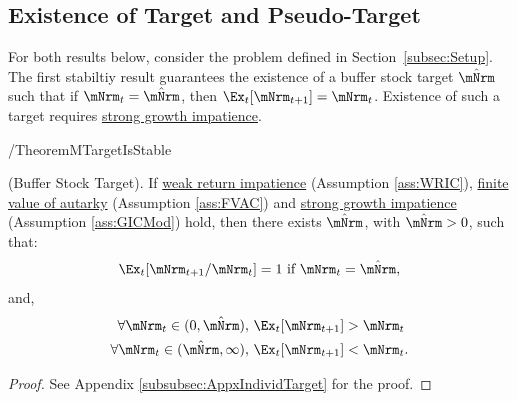 \documentclass[BufferStockTheory]{subfiles}
\begin{document}

\hypertarget{onetarget}{}
\hypertarget{Unique-Stable-Points}{}




\subsection{Existence of Target and Pseudo-Target}\label{subsec:onetarget}\hypertarget{TheoremTarget}{}

For both results below, consider the problem defined in Section~\ref{subsec:Setup}.
The first stabiltiy result guarantees the existence of a buffer stock target $\mTrgNrm$ such that if $\mNrm_{t}=\mTrgNrm$, then $\Ex_{t}[\mNrm_{t+1}]=\mNrm_{t}$.
Existence of such a target requires \hyperlink{GICMod}{strong growth impatience}.

\begin{verbatimwrite}{\EqDir/TheoremMTargetIsStable}
  \begin{theorem}\label{thm:target} (Buffer Stock Target).
If \hyperlink{WRIC}{weak return impatience} (Assumption \ref{ass:WRIC}), \hyperlink{FVAC}{finite value of autarky} (Assumption \ref{ass:FVAC}) and \hyperlink{GICMod}{strong growth impatience} (Assumption \ref{ass:GICMod}) hold, then there exists $\mTrgNrm$, with $\mTrgNrm>0$, such that:
    \begin{equation}
      \Ex_t [{\mNrm}_{t+1}/\mNrm_t] = 1 \mbox{~if~} \mNrm_t = \mTrgNrm, 
      \label{eq:mTarget} %
    \end{equation}
    and, 
    \begin{equation}
      \label{eq:stability} %
      \begin{aligned}
        \forall {\mNrm}_t\in(0,\mTrgNrm),      \,\,& \Ex_t [{\mNrm}_{t+1}] > {\mNrm}_t  \\
        \forall {\mNrm}_t\in(\mTrgNrm,\infty), \,\,& \Ex_t [{\mNrm}_{t+1}] < {\mNrm}_t.
      \end{aligned}
    \end{equation}
  \end{theorem}
\end{verbatimwrite} \unskip


\begin{proof}\let\qed\relax
See Appendix \ref{subsubsec:AppxIndividTarget} for the proof.

\end{proof}
\end{document}
